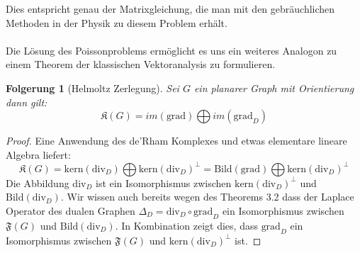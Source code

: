 \documentclass[11pt,a4paper,leqno]{report}
\newtheorem{corollary}[theorem]{Folgerung}
\numberwithin{equation}{chapter}
\begin{document}
Dies entspricht genau der Matrixgleichung, die man mit den gebr\"auchlichen Methoden in der Physik zu diesem Problem erh\"alt.\\
\\
Die L\"osung des Poissonproblems erm\"oglicht es uns ein weiteres Analogon zu einem Theorem der klassischen Vektoranalysis zu formulieren.
\begin{corollary}[Helmoltz Zerlegung]
	Sei $G$ ein planarer Graph mit Orientierung dann gilt:
	$$\mathfrak{K}(G) = im(\text{grad}) \bigoplus im(\text{grad}_D)$$
\end{corollary}
\begin{proof}
	Eine Anwendung des de'Rham Komplexes und etwas elementare lineare Algebra liefert:
	$$\mathfrak{K}(G) = \text{kern}(\text{div}_D)\bigoplus\text{kern}(\text{div}_D)^\perp = \text{Bild}(\text{grad})\bigoplus\text{kern}(\text{div}_D)^\perp$$	
	Die Abbildung $\text{div}_D$ ist ein Isomorphismus zwischen $\text{kern}(\text{div}_D)^\perp$ und $\text{Bild}(\text{div}_D)$. Wir wissen auch bereits wegen des Theorems 3.2 dass der Laplace Operator des dualen Graphen $\Delta_D = \text{div}_D\circ\text{grad}_D$ ein Isomorphismus zwischen $\mathfrak{F}(G)$ und $\text{Bild}(\text{div}_D)$. In Kombination zeigt dies, dass $\text{grad}_D$ ein Isomorphismus zwischen $\mathfrak{F}(G)$ und  $\text{kern}(\text{div}_D)^\perp$ ist.
\end{proof}
\end{document}
